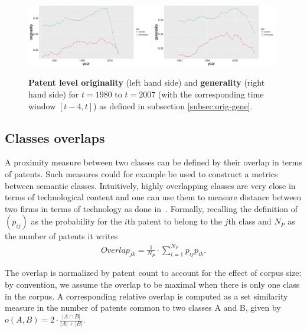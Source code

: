 \documentclass[12pt,twoside,a4paper]{article}
\begin{document}
\begin{figure}
\includegraphics[width=0.49\textwidth]{originality.png}
\includegraphics[width=0.49\textwidth]{generality.png}\\
\caption{\textbf{Patent level originality} (left hand side) and \textbf{generality} (right hand side)  for $t=1980$ to $t=2007$ (with the corresponding time window $[t-4,t]$) as defined in subsection \ref{subsec:orig-gene}. }
\label{fig:orig-gene}
\end{figure}

\subsection{Classes overlaps} \label{subsec:overlaps}

A proximity measure between two classes can be defined by their overlap in terms of patents. 
Such measures could for example be used to construct a metrics between semantic classes. Intuitively, highly overlapping classes are very close in terms of technological content and one can use them to measure distance between two firms in terms of technology as done in~\cite{Bloom2005distance}. Formally, recalling the definition of $\left(p_{ij}\right)$ as the probability for the $i$th patent to belong to the $j$th class and $N_P$ as the number of patents it writes 
\begin{eqnarray}
\label{overlap}
Overlap_{jk} = \frac{1}{N_P}\cdot \sum_{i=1}^{N_P} p_{ij} p_{ik}. 
\end{eqnarray}

The overlap is normalized by patent count to account for the effect of corpus size: by convention, we assume the overlap to be maximal when there is only one class in the corpus. A corresponding relative overlap is computed as a set similarity measure in the number of patents common to two classes A and B, given by $o(A,B)=2\cdot \frac{\left|A\cap B\right|}{\left|A\right| + \left|B\right|}$.
\end{document}
